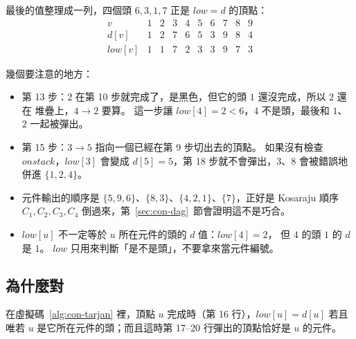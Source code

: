 最後的值整理成一列，四個頭 $6, 3, 1, 7$ 正是 $\mathit{low} = d$ 的頂點：
\[
\begin{array}{c|ccccccccc}
v & 1 & 2 & 3 & 4 & 5 & 6 & 7 & 8 & 9 \\
\hline
d[v] & 1 & 2 & 7 & 6 & 5 & 3 & 9 & 8 & 4 \\
\mathit{low}[v] & 1 & 1 & 7 & 2 & 3 & 3 & 9 & 7 & 3
\end{array}
\]

幾個要注意的地方：

\begin{itemize}
\item 第 13 步：$2$ 在第 10 步就完成了，是黑色，但它的頭 $1$ 還沒完成，所以 $2$ 還在
堆疊上，$4 \to 2$ 要算。 這一步讓 $\mathit{low}[4] = 2 < 6$，$4$ 不是頭，最後和 $1$、
$2$ 一起被彈出。
\item 第 15 步：$3 \to 5$ 指向一個已經在第 9 步切出去的頂點。 如果沒有檢查
$\mathit{onstack}$，$\mathit{low}[3]$ 會變成 $d[5] = 5$，第 18 步就不會彈出，$3$、$8$
會被錯誤地併進 $\{1, 2, 4\}$。
\item 元件輸出的順序是 $\{5,9,6\}$、$\{8,3\}$、$\{4,2,1\}$、$\{7\}$，正好是
Kosaraju 順序 $C_1, C_2, C_3, C_4$ 倒過來，第~\ref{sec:con-dag}~節會證明這不是巧合。
\item $\mathit{low}[u]$ 不一定等於 $u$ 所在元件的頭的 $d$ 值：$\mathit{low}[4] = 2$，
但 $4$ 的頭 $1$ 的 $d$ 是 $1$。 $\mathit{low}$ 只用來判斷「是不是頭」，不要拿來當元件編號。
\end{itemize}

\subsection{為什麼對}

\begin{theorem}
\label{thm:con-tarjan}
在虛擬碼~\ref{alg:con-tarjan} 裡，頂點 $u$ 完成時（第 16 行），$\mathit{low}[u] =
d[u]$ 若且唯若 $u$ 是它所在元件的頭；而且這時第 17--20 行彈出的頂點恰好是 $u$ 的元件。
\end{theorem}


